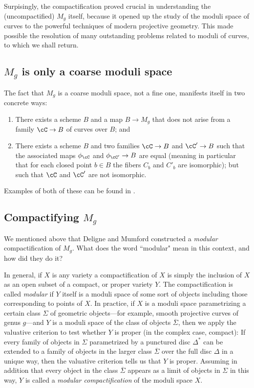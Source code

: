 Surpisingly, the compactification proved crucial in understanding the (uncompactified) $M_g$ itself, because it opened up the study of the moduli space of curves to the powerful techniques of modern projective geometry. This made possible the resolution of many outstanding problems related to moduli of curves, to which we shall return. 
\subsection{$M_g$ is only a coarse moduli space}

The fact that $M_g$ is a coarse moduli space, not a fine one, manifests itself in two concrete ways:

\begin{enumerate}
\item There exists a scheme $B$ and a map $B \to M_g$ that does not arise from a family $\cC \to B$ of curves over $B$; and
\item There exists a scheme $B$ and two families $\cC \to B$ and $\cC' \to B$ such that the associated maps $\phi_\cC$ and $\phi_{\cC'} \to B$ are equal (meaning in particular that for each closed point $b \in B$ the fibers $C_b$ and $C'_b$ are isomorphic); but such that $\cC$ and $\cC'$ are not isomorphic.
\end{enumerate}

Examples of both of these can be found in \cite{GeomSchemes}.

\subsection{Compactifying $M_g$}

We mentioned above that Deligne and Mumford constructed a \emph{modular} compactification of $M_g$. What does the word ``modular" mean in this context, and how did they do it?

In general, if $X$ is any variety a compactification of $X$ is simply the inclusion of $X$ as an open subset of a compact, or proper variety $Y$. The compactification is called \emph{modular} if $Y$ itself is a moduli space of some sort of objects including those corresponding to points of $X$. In practice, if $X$ is a moduli space parametrizing a certain class $\Sigma$ of geometric objects---for example, smooth projective curves of genus $g$---and $Y$ is a moduli space of the class of objects $\overline \Sigma$, then we apply the valuative criterion to test whether $Y$ is proper (in the complex case, compact): If every family of objects in $\Sigma$ parametrized by a punctured disc $\Delta^*$ can be extended to a family of objects in the larger class $\overline \Sigma$ over the full disc $\Delta$ in a unique way, then the valuative criterion tells us that $Y$ is proper. Assuming in addition that every object in the class $\overline \Sigma$ appears as a limit of objects in $\Sigma$ in this way, $Y$ is called a \emph{modular compactification} of the moduli space $X$.

